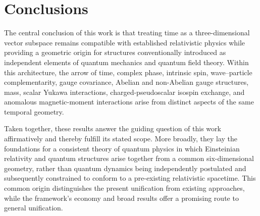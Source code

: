 
\section{Conclusions}
The central conclusion of this work is that treating time as a three-dimensional vector subspace remains compatible with established relativistic physics while providing a geometric origin for structures conventionally introduced as independent elements of quantum mechanics and quantum field theory. Within this architecture, the arrow of time, complex phase, intrinsic spin, wave--particle complementarity, gauge covariance, Abelian and non-Abelian gauge structures, mass, scalar Yukawa interactions, charged-pseudoscalar isospin exchange, and anomalous magnetic-moment interactions arise from distinct aspects of the same temporal geometry.

Taken together, these results answer the guiding question of this work affirmatively and thereby fulfill its stated scope. More broadly, they lay the foundations for a consistent theory of quantum physics in which Einsteinian relativity and quantum structures arise together from a common six-dimensional geometry, rather than quantum dynamics being independently postulated and subsequently constrained to conform to a pre-existing relativistic spacetime. This common origin distinguishes the present unification from existing approaches, while the framework's economy and broad results offer a promising route to general unification.
